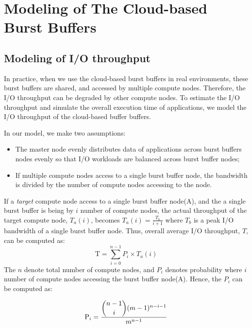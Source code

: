 \section{Modeling of The Cloud-based Burst Buffers}
\label{sec:modeling}
\subsection{Modeling of I/O throughput}
In practice, when we use the cloud-based burst buffers in real environments,
these burst buffers are shared, and accessed by multiple compute nodes.
Therefore, the I/O throughput can be degraded by other compute nodes.
To estimate the I/O throughput and simulate the overall execution
time of applications, we model the I/O throughput of the cloud-based buffer
buffers.

In our model, we make two assumptions: 
\begin{itemize}
  \item The master node evenly distributes data of applications across burst
  buffers nodes evenly so that I/O workloads are balanced across
  burst buffer nodes;
  \item If multiple compute nodes access to a single burst buffer node, the
  bandwidth is divided by the number of compute nodes accessing to the node.
\end{itemize}
If a \emph{target} compute node access to a single burst buffer node(A), and the  
a single burst buffer is being by $i$ number of compute nodes, the actual
throughput of the target compute node, $T_{a}(i)$, becomes
$T_{a}(i)=\frac{T_{b}}{i+1}$ where $T_{b}$ is a peak I/O bandwidth of a single
burst buffer node. Thus, overall average I/O throughput, $T$, can be computed as:
\begin{equation}
\text{T}=\sum_{i=0}^{n-1} P_{i} \times T_{a}(i)
\end{equation}
The $n$ denote total number of compute nodes, and $P_{i}$ denotes probability
where $i$ number of compute nodes accessing the burst buffer node(A). 
Hence, the $P_{i}$ can be computed as:


\begin{equation}
\text{P}_i=\frac{\dbinom{n-1}{i}(m-1)^{n-i-1}}{m^{n-1}}
\end{equation}

